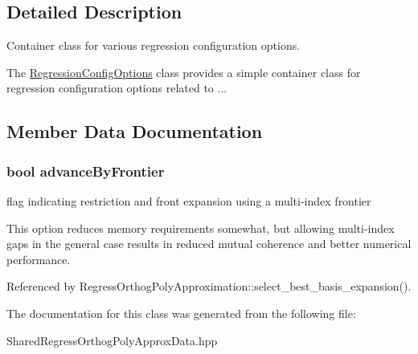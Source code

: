 \subsection{Detailed Description}
Container class for various regression configuration options. 

The \hyperlink{classPecos_1_1RegressionConfigOptions}{Regression\+Config\+Options} class provides a simple container class for regression configuration options related to ... 

\subsection{Member Data Documentation}
\subsubsection[{\texorpdfstring{advance\+By\+Frontier}{advanceByFrontier}}]{\setlength{\rightskip}{0pt plus 5cm}bool advance\+By\+Frontier}\label{classPecos_1_1RegressionConfigOptions_a1b02775f3f1fe2fc66366285325491ea}


flag indicating restriction and front expansion using a multi-\/index frontier 

This option reduces memory requirements somewhat, but allowing multi-\/index gaps in the general case results in reduced mutual coherence and better numerical performance. 

Referenced by Regress\+Orthog\+Poly\+Approximation\+::select\+\_\+best\+\_\+basis\+\_\+expansion().



The documentation for this class was generated from the following file\+:\begin{DoxyCompactItemize}
\item 
Shared\+Regress\+Orthog\+Poly\+Approx\+Data.\+hpp\end{DoxyCompactItemize}
